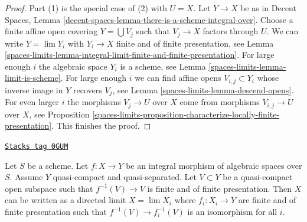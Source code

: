 \begin{proof}
Part (1) is the special case of (2) with $U = X$.
Let $Y \to X$ be as in
Decent Spaces, Lemma \ref{decent-spaces-lemma-there-is-a-scheme-integral-over}.
Choose a finite affine open covering $Y = \bigcup V_j$ such that $V_j \to X$
factors through $U$. We can write $Y = \lim Y_i$ with
$Y_i \to X$ finite and of finite presentation, see
Lemma \ref{spaces-limits-lemma-integral-limit-finite-and-finite-presentation}.
For large enough $i$ the algebraic space $Y_i$ is a scheme, see
Lemma \ref{spaces-limits-lemma-limit-is-scheme}.
For large enough $i$ we can find affine opens $V_{i, j} \subset Y_i$
whose inverse image in $Y$ recovers $V_j$, see
Lemma \ref{spaces-limits-lemma-descend-opens}.
For even larger $i$ the morphisms $V_j \to U$ over $X$ come
from morphisms $V_{i, j} \to U$ over $X$, see Proposition
\ref{spaces-limits-proposition-characterize-locally-finite-presentation}.
This finishes the proof.
\end{proof}

\begin{lemma}
\label{spaces-limits-lemma-integral-limit-finite-and-finite-presentation-refined}
\href{https://stacks.math.columbia.edu/tag/0GUM}{\texttt{Stacks tag 0GUM}}

Let $S$ be a scheme. Let $f : X \to Y$ be an integral morphism of algebraic
spaces over $S$. Assume $Y$ quasi-compact and quasi-separated.
Let $V \subset Y$ be a quasi-compact open subspace such that
$f^{-1}(V) \to V$ is finite and of finite presentation.
Then $X$ can be written as a directed limit $X = \lim X_i$
where $f_i : X_i \to Y$ are finite and of finite presentation
such that $f^{-1}(V) \to f_i^{-1}(V)$ is an isomorphism for all $i$.
\end{lemma}

